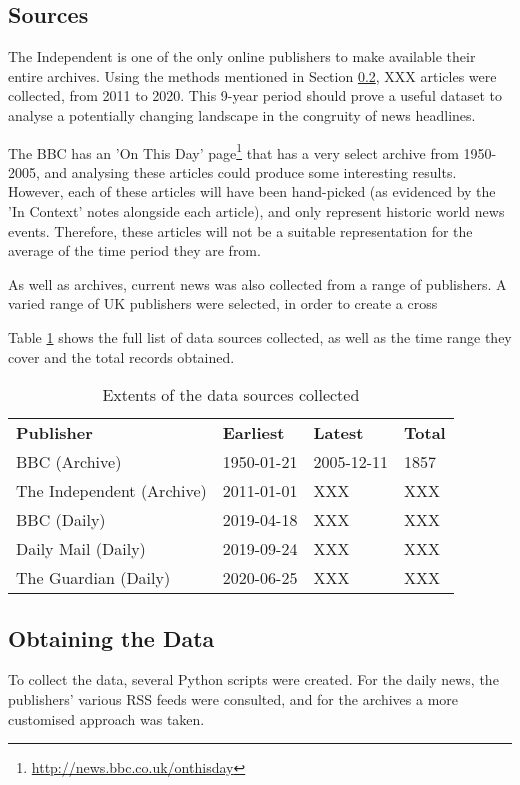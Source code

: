 \documentclass[12pt,a4paper]{article}
\begin{document}
\subsection{Sources}
The Independent is one of the only online publishers to make available their entire archives. Using the methods mentioned in Section \ref{obtaining-data}, XXX articles were collected, from 2011 to 2020. This 9-year period should prove a useful dataset to analyse a potentially changing landscape in the congruity of news headlines.

The BBC has an 'On This Day' page\footnote{\url{http://news.bbc.co.uk/onthisday}} that has a very select archive from 1950-2005, and analysing these articles could produce some interesting results. However, each of these articles will have been hand-picked (as evidenced by the 'In Context' notes alongside each article), and only represent historic world news events. Therefore, these articles will not be a suitable representation for the average of the time period they are from.

As well as archives, current news was also collected from a range of publishers. A varied range of UK publishers were selected, in order to create a cross

Table \ref{tab:data-sources} shows the full list of data sources collected, as well as the time range they cover and the total records obtained.

\begin{table}[]
\begin{tabular}{llll}
\textbf{Publisher} & \textbf{Earliest} & \textbf{Latest} & \textbf{Total} \\
BBC (Archive) & 1950-01-21 & 2005-12-11 & 1857 \\
The Independent (Archive) & 2011-01-01 & XXX & XXX \\
BBC (Daily) & 2019-04-18 & XXX & XXX \\
Daily Mail (Daily) & 2019-09-24 & XXX & XXX \\
The Guardian (Daily) & 2020-06-25 & XXX & XXX \\
\end{tabular}
\caption{Extents of the data sources collected}
\label{tab:data-sources}
\end{table}

\subsection{Obtaining the Data} \label{obtaining-data}
To collect the data, several Python scripts were created. For the daily news, the publishers' various RSS feeds were consulted, and for the archives a more customised approach was taken.
\end{document}
